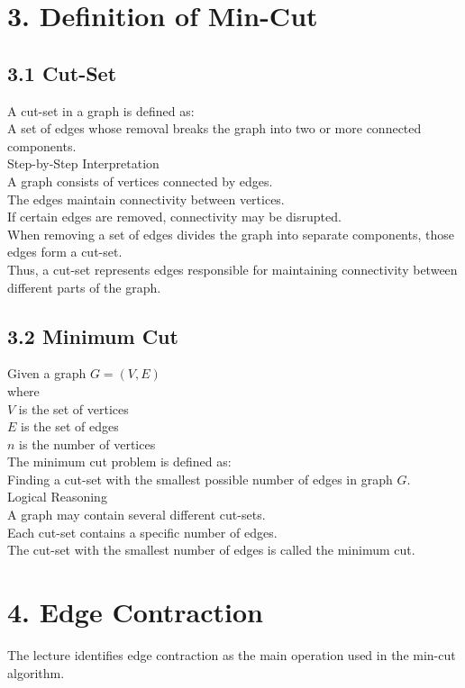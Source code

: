 \documentclass{article}
\begin{document}
\section{3. Definition of Min-Cut}

\subsection{3.1 Cut-Set}
A cut-set in a graph is defined as: \\
A set of edges whose removal breaks the graph into two or more connected components. \\
Step-by-Step Interpretation \\
A graph consists of vertices connected by edges. \\
The edges maintain connectivity between vertices. \\
If certain edges are removed, connectivity may be disrupted. \\
When removing a set of edges divides the graph into separate components, those edges form a cut-set. \\
Thus, a cut-set represents edges responsible for maintaining connectivity between different parts of the graph.

\subsection{3.2 Minimum Cut}
Given a graph $G=(V,E)$ \\
where \\
$V$ is the set of vertices \\
$E$ is the set of edges \\
$n$ is the number of vertices \\
The minimum cut problem is defined as: \\
Finding a cut-set with the smallest possible number of edges in graph $G$. \\
Logical Reasoning \\
A graph may contain several different cut-sets. \\
Each cut-set contains a specific number of edges. \\
The cut-set with the smallest number of edges is called the minimum cut.

\section{4. Edge Contraction}
The lecture identifies edge contraction as the main operation used in the min-cut algorithm.
\end{document}
